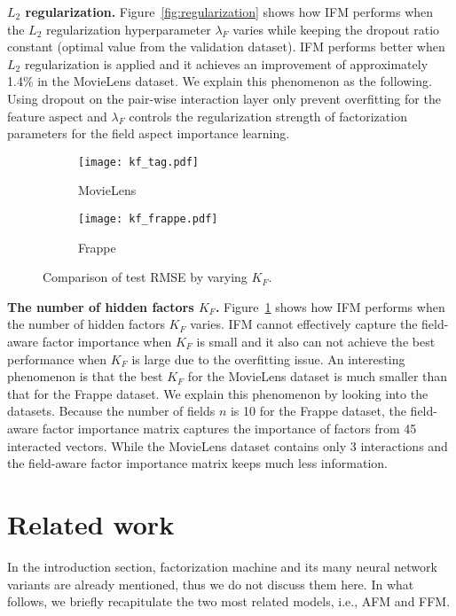 \documentclass[letterpaper]{article} \usepackage{aaai19}  \usepackage{times}  \usepackage{helvet}  \usepackage{courier}  \usepackage{url}  \usepackage{graphicx}  \frenchspacing  \setlength{\pdfpagewidth}{8.5in}  \setlength{\pdfpageheight}{11in}  \usepackage{mathtools}
\begin{document}
\textbf{$L_2$ regularization.} Figure~\ref{fig:regularization} shows how IFM performs when the $L_2$ regularization hyperparameter $\lambda_F$ varies while keeping the dropout ratio constant (optimal value from the validation dataset). IFM performs better when $L_2$ regularization is applied and it achieves an improvement of approximately 1.4\% in the MovieLens dataset. We explain this phenomenon as the following. Using dropout on the pair-wise interaction layer only prevent overfitting for the feature aspect and $\lambda_F$ controls the regularization strength of factorization parameters for the field aspect importance learning. 



\begin{figure}[t!]
\begin{center} 
\begin{subfigure}[MovieLens]{0.47\columnwidth}
{
\texttt{[image: kf\_tag.pdf]}
\caption{MovieLens}
}
\end{subfigure}  
\begin{subfigure}[Frappe]{0.47\columnwidth}
{
\texttt{[image: kf\_frappe.pdf]}
\caption{Frappe}
} 
\end{subfigure} 
\caption{Comparison of test RMSE by varying $K_F$.} 
\label{fig:kf_hidden} 
\end{center}
\end{figure} 


\textbf{The number of hidden factors $K_F$.} Figure~\ref{fig:kf_hidden} shows how IFM performs when the number of hidden factors $K_F$ varies. IFM cannot effectively capture the field-aware factor importance when $K_F$ is small and it also can not achieve the best performance when $K_F$ is large due to the overfitting issue. An interesting phenomenon is that the best $K_F$ for the MovieLens dataset is much smaller than that for the Frappe dataset. We explain this phenomenon by looking into the datasets. Because the number of fields $n$ is 10 for the Frappe dataset, the field-aware factor importance matrix captures the importance of factors from 45 interacted vectors. While the MovieLens dataset contains only 3 interactions and the field-aware factor importance matrix keeps much less information. 


\section{Related work} \label{sec:related}
In the introduction section, factorization machine and its many neural network variants are already mentioned, thus we do not discuss them here. In what follows, we briefly recapitulate the two most related models, i.e., AFM\cite{xiaoattentional} and FFM\cite{juan2016field}.
\end{document}
